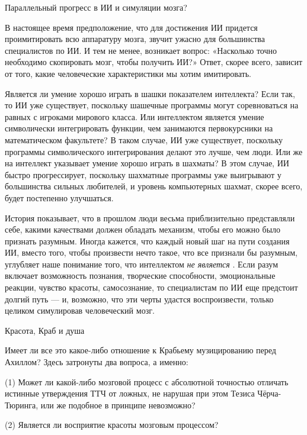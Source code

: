 \documentclass[../main.tex]{subfiles}
\begin{document}
Параллельный прогресс в ИИ и симуляции мозга?

В настоящее время предположение, что для достижения ИИ придется проимитировать всю аппаратуру мозга, звучит ужасно для большинства специалистов по ИИ\@. И тем не менее, возникает вопрос: «Насколько точно необходимо скопировать мозг, чтобы получить ИИ?» Ответ, скорее всего, зависит от того, какие человеческие характеристики мы хотим имитировать.

Является ли умение хорошо играть в шашки показателем интеллекта? Если так, то ИИ уже существует, поскольку шашечные программы могут соревноваться на равных с игроками мирового класса. Или интеллектом является умение символически интегрировать функции, чем занимаются первокурсники на математическом факультете? В таком случае, ИИ уже существует, поскольку программы символического интегрирования делают это лучше, чем люди. Или же на интеллект указывает умение хорошо играть в шахматы? В этом случае, ИИ быстро прогрессирует, поскольку шахматные программы уже выигрывают у большинства сильных любителей, и уровень компьютерных шахмат, скорее всего, будет постепенно улучшаться.

История показывает, что в прошлом люди весьма приблизительно представляли себе, какими качествами должен обладать механизм, чтобы его можно было признать разумным. Иногда кажется, что каждый новый шаг на пути создания ИИ, вместо того, чтобы произвести нечто такое, что все признали бы разумным, углубляет наше понимание того, что интеллектом \emph{не является} . Если разум включает возможность познания, творческие способности, эмоциональные реакции, чувство красоты, самосознание, то специалистам по ИИ еще предстоит долгий путь --- и, возможно, что эти черты удастся воспроизвести, только целиком симулировав человеческий мозг.

Красота, Краб и душа

Имеет ли все это какое-либо отношение к Крабьему музицированию перед Ахиллом? Здесь затронуты два вопроса, а именно:

(1) Может ли какой-либо мозговой процесс с абсолютной точностью отличать истинные утверждения ТТЧ от ложных, не нарушая при этом Тезиса Чёрча-Тюринга, или же подобное в принципе невозможно?

(2) Является ли восприятие красоты мозговым процессом?
\end{document}
